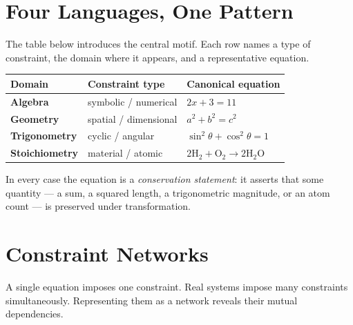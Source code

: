 \documentclass[11pt, openany]{book}
\theoremstyle{plain}
\theoremstyle{definition}
\theoremstyle{remark}
\begin{document}
\section{Four Languages, One Pattern}

The table below introduces the central motif. Each row names a type of
constraint, the domain where it appears, and a representative equation.

\begin{center}
\renewcommand{\arraystretch}{1.6}
\begin{tabular}{>{\bfseries}p{2.8cm} p{3.2cm} p{5.8cm}}
\toprule
\color{ctBlue}Domain & \color{ctBlue}Constraint type & \color{ctBlue}Canonical equation \\
\midrule
Algebra       & symbolic / numerical   & $2x+3=11$ \\
Geometry      & spatial / dimensional  & $a^2+b^2=c^2$ \\
Trigonometry  & cyclic / angular       & $\sin^2\theta+\cos^2\theta=1$ \\
Stoichiometry & material / atomic      & $2\mathrm{H_2+O_2\to2H_2O}$ \\
\bottomrule
\end{tabular}
\end{center}

In every case the equation is a \emph{conservation statement}: it asserts that
some quantity --- a sum, a squared length, a trigonometric magnitude, or an
atom count --- is preserved under transformation.

\section{Constraint Networks}

A single equation imposes one constraint. Real systems impose many constraints
simultaneously. Representing them as a network reveals their mutual
dependencies.

\begin{center}
\end{center}
\end{document}
